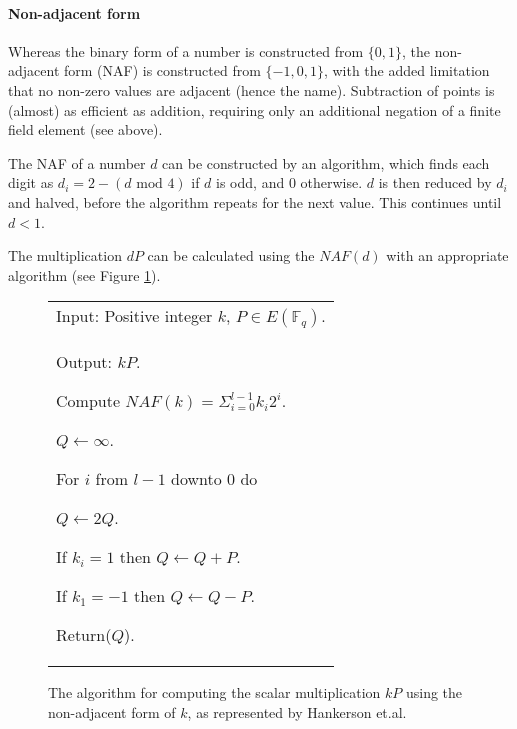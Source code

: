 \paragraph{Non-adjacent form}

Whereas the binary form of a number is constructed from \(\{0,1\}\), the non-adjacent form (NAF) is constructed from \(\{-1,0,1\}\), with
the added limitation that no non-zero values are adjacent (hence the name). Subtraction of points is (almost) as efficient as addition,
requiring only an additional negation of a finite field element (see above).

The NAF of a number \(d\) can be constructed by an algorithm, which finds each digit as \(d_i = 2 - (d \text{ mod } 4)\) if \(d\) is odd, and
\(0\) otherwise. \(d\) is then reduced by \(d_i\) and halved, before the algorithm repeats for the next value. This continues until \(d < 1\).

The multiplication \(dP\) can be calculated using the \(NAF(d)\) with an appropriate algorithm (see Figure \ref{fig:naf-algorithm}).\cite{hankerson2010}

\begin{figure}[htb!]
	\centering
	\begin{tabular}{|p{\textwidth}|}
		\hline
		Input: Positive integer \(k\), \(P \in E(\mathbb{F}_q)\). \\
		Output: \(kP\).

		\begin{enumerate*}
			\item Compute \(NAF(k) = \Sigma^{l-1}_{i=0} k_i2^i\).
			\item \(Q \gets \infty\).
			\item For \(i\) from \(l-1\) downto \(0\) do
			\begin{enumerate*}
				\item \(Q \gets 2Q\).
				\item If \(k_i = 1\) then \(Q \gets Q + P\).
				\item If \(k_1 = -1\) then \(Q \gets Q - P\).
			\end{enumerate*}
			\item Return(\(Q\)).
		\end{enumerate*}
		\\
		\hline
	\end{tabular}
	\caption{The algorithm for computing the scalar multiplication \(kP\) using the non-adjacent form of \(k\), as represented by
		Hankerson et.al.\cite{hankerson2010}}
	\label{fig:naf-algorithm}
\end{figure}

